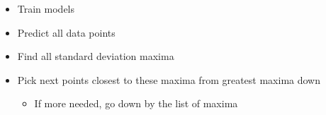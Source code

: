 \documentclass{article}
\begin{document}
\begin{itemize}
    \item Train models
    \item Predict all data points
    \item Find all standard deviation maxima
    \item Pick next points closest to these maxima from greatest maxima down
    \begin{itemize}
        \item If more needed, go down by the list of maxima
    \end{itemize} 
\end{itemize}
\end{document}
